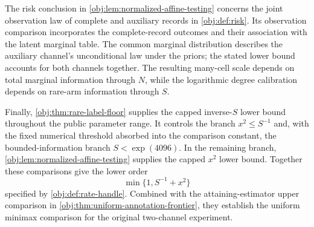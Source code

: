 The risk conclusion in \cref{obj:lem:normalized-affine-testing} concerns the joint observation law of complete and auxiliary records in \cref{obj:def:risk}. Its observation comparison incorporates the complete-record outcomes and their association with the latent marginal table. The common marginal distribution describes the auxiliary channel's unconditional law under the priors; the stated lower bound accounts for both channels together. The resulting many-cell scale depends on total marginal information through \(N\), while the logarithmic degree calibration depends on rare-arm information through \(S\).

Finally, \cref{obj:thm:rare-label-floor} supplies the capped inverse-\(S\) lower bound throughout the public parameter range. It controls the branch \(x^2\le S^{-1}\) and, with the fixed numerical threshold absorbed into the comparison constant, the bounded-information branch \(S<\exp(4096)\). In the remaining branch, \cref{obj:lem:normalized-affine-testing} supplies the capped \(x^2\) lower bound. Together these comparisons give the lower order
\[
\min\{1,S^{-1}+x^2\}
\]
specified by \cref{obj:def:rate-handle}. Combined with the attaining-estimator upper comparison in \cref{obj:thm:uniform-annotation-frontier}, they establish the uniform minimax comparison for the original two-channel experiment.
